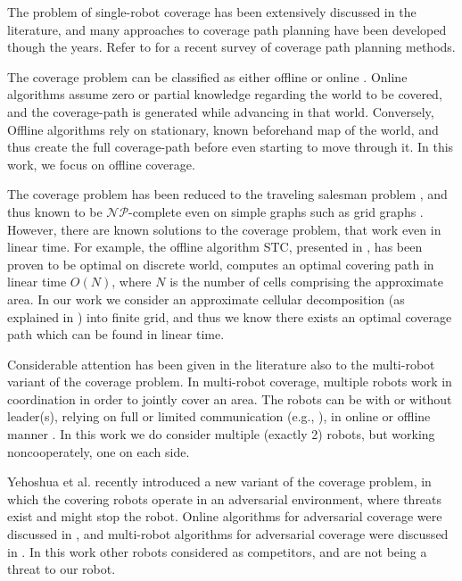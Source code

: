 The problem of single-robot coverage has been extensively discussed in the literature, and many approaches to coverage path planning have been developed though the years. Refer to \cite{galceran2013survey} for a recent survey of coverage path planning methods.

The coverage problem can be classified as either offline or online \cite{choset2001coverage}.
Online algorithms assume zero or partial knowledge regarding the world to be covered, and the coverage-path is generated while advancing in that world. Conversely, Offline algorithms rely on stationary, known beforehand map of the world, and thus create the full coverage-path before even starting to move through it. In this work, we focus on offline coverage.

The coverage problem has been reduced to the traveling salesman problem \cite{arkin2000approximation}, and thus known to be $\mathcal{NP}$-complete even on simple graphs such as grid graphs \cite{papadimitriou1977euclidean}. However, there are known solutions to the coverage problem, that work even in linear time. For example, the offline algorithm STC, presented in \cite{gabriely2001spanning}, has been proven to be optimal on discrete world, computes an optimal covering path in linear time $O(N)$, where $N$ is the number of cells comprising the approximate area. In our work we consider an approximate cellular decomposition (as explained in \cite{galceran2013survey}) into finite grid, and thus we know there exists an optimal coverage path which can be found in linear time.

Considerable attention has been given in the literature also to the multi-robot variant of the coverage problem. In multi-robot coverage, multiple robots work in coordination in order to jointly cover an area. The robots can be with or without leader(s), relying on full or limited communication (e.g., \cite{agmon2008giving}), in online or offline manner \cite{agmon2008giving, de2005blind}.
In this work we do consider multiple (exactly 2) robots, but working noncooperately, one on each side.

Yehoshua et al. \cite{yehoshua2013robotic} recently introduced a new variant of the coverage problem, in which the covering robots operate in an adversarial environment, where threats exist and might stop the robot. Online algorithms for adversarial coverage were discussed in  \cite{yehoshua2015online}, and multi-robot algorithms for adversarial coverage were discussed in \cite{yehoshua2016multi}.
In this work other robots considered as competitors, and are not being a threat to our robot.

